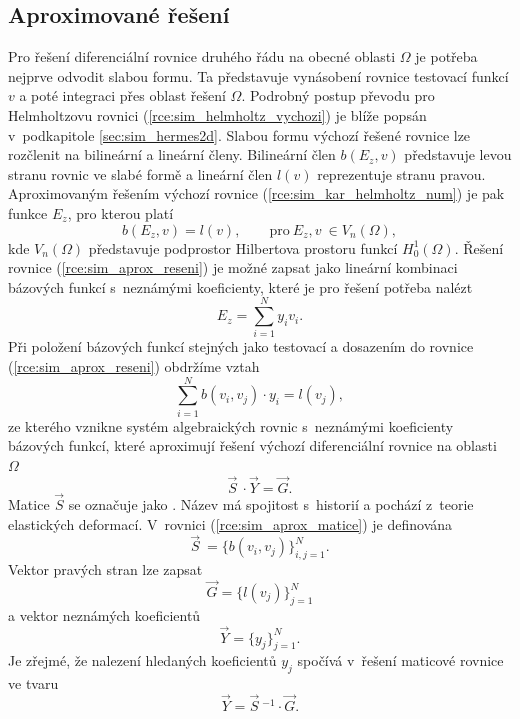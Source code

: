 \subsection{Aproximované řešení}
Pro řešení diferenciální rovnice druhého řádu na obecné oblasti $\Omega$ je potřeba nejprve odvodit slabou formu. Ta představuje vynásobení rovnice testovací funkcí $v$ a poté integraci přes oblast řešení $\Omega$. Podrobný postup převodu pro Helmholtzovu rovnici (\ref{rce:sim_helmholtz_vychozi}) je blíže popsán v~podkapitole \ref{sec:sim_hermes2d}. Slabou formu výchozí řešené rovnice lze rozčlenit na bilineární a lineární členy. Bilineární člen $b(E_z,v)$ představuje levou stranu rovnic ve slabé formě a lineární člen $l(v)$ reprezentuje stranu pravou.
Aproximovaným řešením výchozí rovnice (\ref{rce:sim_kar_helmholtz_num}) je pak funkce $E_z$, pro kterou platí 
\begin{equation}
	b(E_z,v) = l(v),\qquad \mathrm{pro}\ E_z, v~\in V_{n}(\Omega),
	\label{rce:sim_aprox_reseni}
\end{equation}
kde $V_{n}(\Omega)$ představuje podprostor Hilbertova prostoru funkcí $H_{0}^{1}(\Omega)$. Řešení rovnice (\ref{rce:sim_aprox_reseni}) je možné zapsat jako lineární kombinaci bázových funkcí s~neznámými koeficienty, které je pro řešení potřeba nalézt
\begin{displaymath}
	E_z = \sum_{i=1}^{N}y_i v_i.
\end{displaymath}
Při položení bázových funkcí stejných jako testovací a dosazením do rovnice  (\ref{rce:sim_aprox_reseni}) obdržíme vztah
\begin{equation}
	\sum_{i=1}^{N}b(v_i,v_j)\cdot y_i = l(v_j),
	\label{rce:sim_aprox_reseni2}
\end{equation}
ze kterého vznikne systém algebraických rovnic s~neznámými koeficienty bázových funkcí, které aproximují řešení výchozí diferenciální rovnice na oblasti $\Omega$
\begin{equation}
	\vec S~\cdot \vec Y = \vec G.
	\label{rce:sim_aprox_matice}
\end{equation}
Matice $\vec S$ se označuje jako . Název má spojitost s~historií a pochází z~teorie elastických deformací. V~rovnici (\ref{rce:sim_aprox_matice}) je definována
\begin{displaymath}
	\vec S~= \{b(v_i,v_j) \}_{i,j = 1}^{N}.
\end{displaymath}
Vektor pravých stran lze zapsat
\begin{displaymath}
	\vec G = \{l(v_j) \}_{j = 1}^{N}
\end{displaymath}
a vektor neznámých koeficientů
\begin{displaymath}
	\vec Y = \{y_j \}_{j = 1}^{N}.
\end{displaymath}
Je zřejmé, že nalezení hledaných koeficientů $y_j$ spočívá v~řešení maticové rovnice ve tvaru
\begin{equation}
	\vec Y = \vec S~^{-1}\cdot \vec G.
	\label{rce:sim_aprox_inv_matice}
\end{equation}

